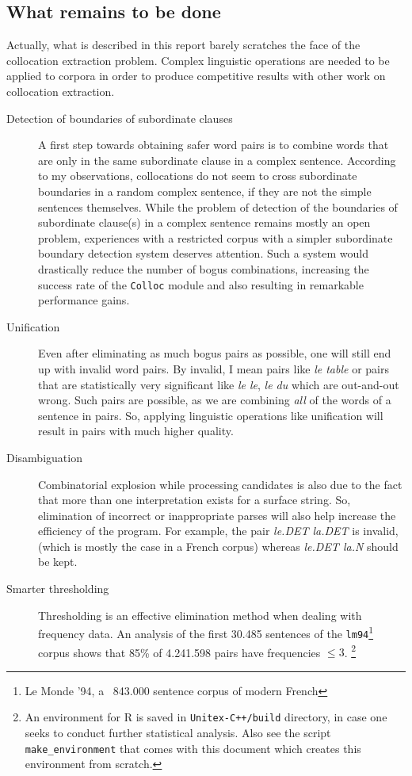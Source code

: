 \documentclass[a4paper,12pt,oneside]{article}
\begin{document}
\subsection{What remains to be done}
Actually, what is described in this report barely scratches the face of the collocation extraction problem. Complex linguistic operations are needed to be applied to corpora in order to produce competitive results with other work on collocation extraction. 

\begin{description}
\item[Detection of boundaries of subordinate clauses]
	A first step towards obtaining safer word pairs is to combine words that are only in the same subordinate clause in a complex sentence. According to my observations, collocations do not seem to cross subordinate boundaries in a random complex sentence, if they are not the simple sentences themselves. While the problem of detection of the boundaries of subordinate clause(s) in a complex sentence remains mostly an open problem, experiences with a restricted corpus with a simpler subordinate boundary detection system deserves attention. Such a system would drastically reduce the number of bogus combinations, increasing the success rate of the \texttt{Colloc} module and also resulting in remarkable performance gains.

\item[Unification]
	Even after eliminating as much bogus pairs as possible, one will still end up with invalid word pairs. By invalid, I mean pairs like \emph{le table} or pairs that are statistically very significant like \emph{le le}, \emph{le du} which are out-and-out wrong. Such pairs are possible, as we are combining \emph{all} of the words of a sentence in pairs. So, applying linguistic operations like unification will result in pairs with much higher quality.

\item[Disambiguation]
	Combinatorial explosion while processing candidates is also due to the fact that more than one interpretation exists for a surface string. So, elimination of incorrect or inappropriate parses will also help increase the efficiency of the program. For example, the pair \emph{le.DET la.DET} is invalid, (which is mostly the case in a French corpus) whereas \emph{le.DET la.N} should be kept.

\item[Smarter thresholding]
	Thresholding is an effective elimination method when dealing with frequency data. An analysis of the first 30.485 sentences of the \texttt{lm94}\footnote{Le Monde '94, a ~843.000 sentence corpus of modern French} corpus shows that 85\% of 4.241.598 pairs have frequencies $\leq 3$. \footnote{An environment for R\cite{RProject} is saved in \texttt{Unitex-C++/build} directory, in case one seeks to conduct further statistical analysis. Also see the script \texttt{make\_environment} that comes with this document which creates this environment from scratch.}


\end{description}
\end{document}
